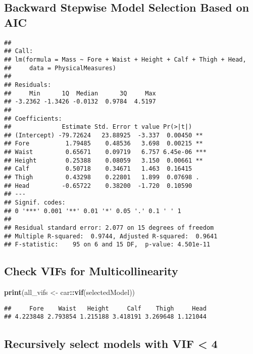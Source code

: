 \documentclass[]{article}
\newenvironment{Shaded}{\begin{snugshade}}{\end{snugshade}}
\newcommand{\KeywordTok}[1]{\textcolor[rgb]{0.13,0.29,0.53}{\textbf{#1}}}
\newcommand{\StringTok}[1]{\textcolor[rgb]{0.31,0.60,0.02}{#1}}
\newcommand{\OperatorTok}[1]{\textcolor[rgb]{0.81,0.36,0.00}{\textbf{#1}}}
\newcommand{\NormalTok}[1]{#1}
\begin{document}
\subsection{Backward Stepwise Model Selection Based on
AIC}\label{backward-stepwise-model-selection-based-on-aic-1}

\begin{verbatim}
## 
## Call:
## lm(formula = Mass ~ Fore + Waist + Height + Calf + Thigh + Head, 
##     data = PhysicalMeasures)
## 
## Residuals:
##     Min      1Q  Median      3Q     Max 
## -3.2362 -1.3426 -0.0132  0.9784  4.5197 
## 
## Coefficients:
##              Estimate Std. Error t value Pr(>|t|)    
## (Intercept) -79.72624   23.88925  -3.337  0.00450 ** 
## Fore          1.79485    0.48536   3.698  0.00215 ** 
## Waist         0.65671    0.09719   6.757 6.45e-06 ***
## Height        0.25388    0.08059   3.150  0.00661 ** 
## Calf          0.50718    0.34671   1.463  0.16415    
## Thigh         0.43298    0.22801   1.899  0.07698 .  
## Head         -0.65722    0.38200  -1.720  0.10590    
## ---
## Signif. codes:  
## 0 '***' 0.001 '**' 0.01 '*' 0.05 '.' 0.1 ' ' 1
## 
## Residual standard error: 2.077 on 15 degrees of freedom
## Multiple R-squared:  0.9744, Adjusted R-squared:  0.9641 
## F-statistic:    95 on 6 and 15 DF,  p-value: 4.501e-11
\end{verbatim}

\subsection{Check VIFs for
Multicollinearity}\label{check-vifs-for-multicollinearity}

\begin{Shaded}
\begin{Highlighting}[]
\KeywordTok{print}\NormalTok{(all_vifs <-}\StringTok{ }\NormalTok{car}\OperatorTok{::}\KeywordTok{vif}\NormalTok{(selectedModel))}
\end{Highlighting}
\end{Shaded}

\begin{verbatim}
##     Fore    Waist   Height     Calf    Thigh     Head 
## 4.223848 2.793854 1.215188 3.418191 3.269648 1.121044
\end{verbatim}

\subsection{Recursively select models with VIF \textless{}
4}\label{recursively-select-models-with-vif-4}
\end{document}
